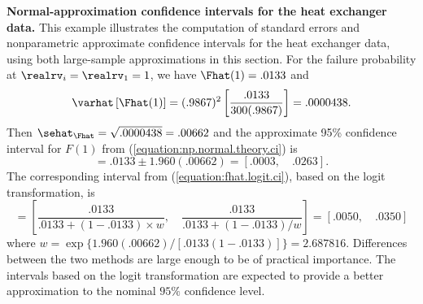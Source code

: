 \begin{example}
\label{example:heat.ex.nonpar.nor}
{\bf Normal-approximation confidence intervals for the heat exchanger data.}
This example illustrates the computation of 
standard errors and nonparametric approximate confidence
intervals for the heat exchanger data, 
using both large-sample approximations in this section.
For the failure probability at $\realrv_{i}=\realrv_{1}=1$, we have
$\Fhat(1)=.0133$ and
\begin{displaymath}
\varhat \left [\Fhat(1) \right ]
=(.9867)^{2}
\left[ \frac{.0133}{300(.9867)} \right]=.0000438.
\end{displaymath}
Then
$\sehat_{\Fhat} =\sqrt{.0000438}=.00662$
and the approximate
95\% confidence interval for $F(1)$ from
(\ref{equation:np.normal.theory.ci})
is
\begin{displaymath}
[\undertilde{F}(1), \quad \tilde{F}(1)] = 
 .0133 \pm 1.960(.00662)=[.0003, \quad .0263].
\end{displaymath}
The corresponding interval from (\ref{equation:fhat.logit.ci}),
based on the logit transformation, is
\begin{displaymath}
[\undertilde{F}(1), \quad \tilde{F}(1)] = 
\left[\frac{.0133}{.0133
+(1-.0133) \times w}, \quad \frac{.0133}{.0133+
(1-.0133)/w}\right] = \left[.0050, \quad .0350\right]
\end{displaymath}
where $w=\exp\{1.960(.00662)/[.0133(1-.0133)]\}=2.687816$.
Differences between the two methods are large enough
to be of practical importance. The intervals based on the logit
transformation are expected to provide a better approximation
to the nominal $95\%$ confidence level.


\end{example}
